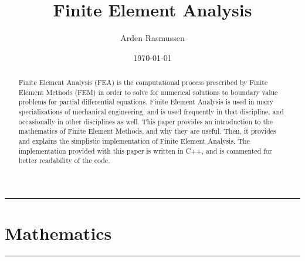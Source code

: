 \documentclass[10pt]{armath}
\title{Finite Element Analysis}
\author{Arden Rasmussen}
\date{\today}
\numberwithin{equation}{section}
\theoremstyle{definition}
\newcommand{\hdiv}[3]{
  \vspace{#1}%
  \noindent\rule{\textwidth}{#2}%
  \vspace{#3}%
}
\begin{document}
\maketitle

\begin{abstract}
  Finite Element Analysis (FEA) is the computational process prescribed by
  Finite Element Methods (FEM) in order to solve for numerical solutions to
  boundary value problems for partial differential equations. Finite Element
  Analysis is used in many specializations of mechanical engineering, and is
  used frequently in that discipline, and occasionally in other disciplines as
  well. This paper provides an introduction to the mathematics of Finite
  Element Methods, and why they are useful. Then, it provides and explains the
  simplistic implementation of Finite Element Analysis. The implementation
  provided with this paper is written in C++, and is commented for better
  readability of the code.
\end{abstract}

\begin{multicols}{2}
  
\end{multicols}

\newpage
\hdiv{10pt}{0.5pt}{1pt}
\part{Mathematics}%
\label{prt:mathematics}
\hdiv{1pt}{0.5pt}{10pt}

\begin{multicols}{2}

  
  
  
  
  
  
  
  

  \nocite{*}
  
  
\end{multicols}
\end{document}
